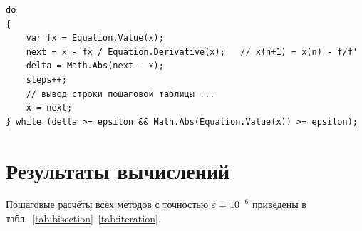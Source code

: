 \documentclass[14pt,a4paper]{extarticle}
\begin{document}
\begin{lstlisting}[caption={Итерационный процесс метода Ньютона (NewtonSolver.cs)}]
do
{
    var fx = Equation.Value(x);
    next = x - fx / Equation.Derivative(x);   // x(n+1) = x(n) - f/f'
    delta = Math.Abs(next - x);
    steps++;
    // вывод строки пошаговой таблицы ...
    x = next;
} while (delta >= epsilon && Math.Abs(Equation.Value(x)) >= epsilon);
\end{lstlisting}

\section{Результаты вычислений}

Пошаговые расчёты всех методов с точностью $\varepsilon = 10^{-6}$
приведены в табл.~\ref{tab:bisection}--\ref{tab:iteration}.
\end{document}
